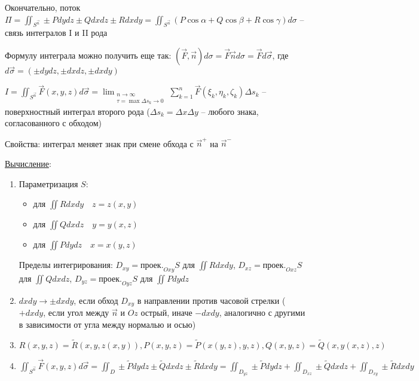 \documentclass[12pt]{article}
\begin{document}
\begin{enumerate}[label*=\textbf{\arabic** }]
    \hypertarget{connectionbetweensurfaceintegral}{}

    Окончательно, поток $\Pi = \iint_{S^{\vec{n}}} \pm Pdydz \pm Qdxdz \pm Rdxdy = \iint_{S^{\vec{n}}} (P\cos\alpha + Q\cos\beta + R\cos\gamma) d\sigma$ -- связь интегралов I и II рода

    \Nota Формулу интеграла можно получить еще так: $(\vec{F}, \vec{n})d\sigma = \vec{F}\vec{n}d\sigma = \vec{F}d\vec{\sigma}$, где $d\vec{\sigma} = (\pm dydz, \pm dxdz, \pm dxdy)$

    \hypertarget{surfaceintegralofsecondkindmath}{}

    \Def $I = \iint_{S^{\vec{n}}} \vec F(x, y, z) d\vec\sigma = \lim_{\substack{n \to \infty \\ \tau = \max \Delta s_k \to 0}} \sum_{k=1}^n \vec F(\xi_k, \eta_k, \zeta_k) \Delta s_k$ -- поверхностный интеграл второго рода
    ($\Delta s_k = \Delta x\Delta y$ -- любого знака, согласованного с обходом)

    \hypertarget{surfaceintegralofsecondkindproperties}{}

    Свойства: интеграл меняет знак при смене обхода с $\vec{n}^+$ на $\vec{n}^-$

    \hypertarget{surfaceintegralofsecondkindcalculation}{}

    \underline{Вычисление}:

    \begin{enumerate}
        \item Параметризация $S$:
        
        \begin{itemize}
            \item для $\iint Rdxdy \quad z = z(x, y)$
            
            \item для $\iint Qdxdz \quad y = y(x, z)$

            \item для $\iint Pdydz \quad x = x(y, z)$
        \end{itemize}

        Пределы интегрирования: $D_{xy} = \text{проек.}_{Oxy} S$ для $\iint Rdxdy$, $D_{xz} = \text{проек.}_{Oxz} S$ для $\iint Qdxdz$, $D_{yz} = \text{проек.}_{Oyz} S$ для $\iint Pdydz$

        \item $dxdy \to \pm dxdy$, если обход $D_{xy}$ в направлении против часовой стрелки ($+dxdy$, если угол между $\vec{n}$ и $Oz$ острый, иначе $-dxdy$, аналогично с другими в зависимости от угла между нормалью и осью)

        \item $R(x, y, z) = \tilde{R}(x, y, z(x, y)), P(x, y, z) = \tilde{P}(x(y, z), y, z), Q(x, y, z) = \tilde{Q}(x, y(x, z), z)$

        \item $\iint_{S^{\overrightarrow{n}}} \vec F(x, y, z) d\vec\sigma = \iint_{D} \pm \tilde{P}dydz \pm \tilde{Q}dxdz \pm \tilde{R}dxdy = \iint_{D_{yz}} \pm \tilde{P}dydz + \iint_{D_{xz}} \pm \tilde{Q}dxdz + \iint_{D_{xy}} \pm \tilde{R}dxdy$
    \end{enumerate}
    \end{enumerate}
\end{document}
